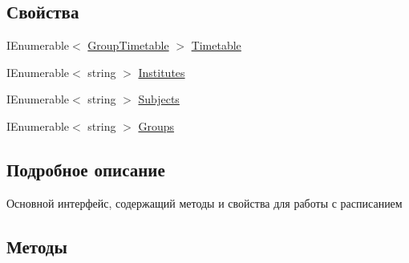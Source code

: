 \subsection*{Свойства}
\begin{DoxyCompactItemize}
\item 
I\+Enumerable$<$ \hyperlink{class_s_f_u_timetable_parser_1_1_core_1_1_entities_1_1_group_timetable}{Group\+Timetable} $>$ \hyperlink{interface_s_f_u_timetable_parser_1_1_core_1_1_i_timetable_manager_ac092d73b1bfbbc5b5f1f50cb2234d622}{Timetable}
\item 
I\+Enumerable$<$ string $>$ \hyperlink{interface_s_f_u_timetable_parser_1_1_core_1_1_i_timetable_manager_a9902fba6fdbe6a7050bd0ec81c6f0639}{Institutes}
\item 
I\+Enumerable$<$ string $>$ \hyperlink{interface_s_f_u_timetable_parser_1_1_core_1_1_i_timetable_manager_aa783c9659f88b59d3d5e97a91eb0764c}{Subjects}
\item 
I\+Enumerable$<$ string $>$ \hyperlink{interface_s_f_u_timetable_parser_1_1_core_1_1_i_timetable_manager_af5f2f109ae2194ec9737a0d5242579f0}{Groups}
\end{DoxyCompactItemize}


\subsection{Подробное описание}
Основной интерфейс, содержащий методы и свойства для работы с расписанием 

\subsection{Методы}
\mbox{\label{interface_s_f_u_timetable_parser_1_1_core_1_1_i_timetable_manager_aeb182ac554490f3c0db80691c1a8f739}} 
